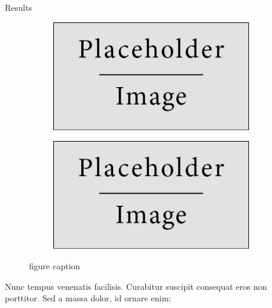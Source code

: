 \documentclass[final]{beamer}
\newlength{\sepwid}
\newlength{\twocolwid}
\begin{document}
\begin{frame}[t]
\begin{columns}[t]
\begin{column}{\twocolwid}
\begin{block}{Results}
\begin{figure}[h]
  \centering
    \begin{subfigure}[b]{0.4\textwidth}
        \includegraphics[width=\textwidth]{Placeholder.jpg}
        \caption{}
        \label{fig:NNMF}
    \end{subfigure}
          \begin{subfigure}[b]{0.4\textwidth}
        \includegraphics[width=\textwidth]{Placeholder.jpg}
        \caption{}
        \label{fig:PCA}
    \end{subfigure}
  \caption{figure caption}
\end{figure}

Nunc tempus venenatis facilisis. Curabitur suscipit consequat eros non porttitor. Sed a massa dolor, id ornare enim:


\end{block}


\end{column} %

\begin{column}{\sepwid}\end{column} %


\end{columns}
\end{frame}
\end{document}
